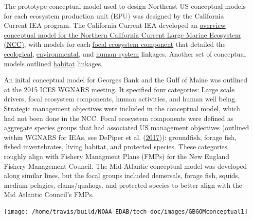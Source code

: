 \documentclass[
]{book}
\begin{document}
The prototype conceptual model used to design Northeast US conceptual models for each ecosystem production unit (EPU) was designed by the California Current IEA program. The California Current IEA developed an \href{https://www.integratedecosystemassessment.noaa.gov/regions/california-current/cc-ecosystem-components}{overview conceptual model for the Northern California Current Large Marine Ecosystem (NCC)}, with models for each \href{https://www.integratedecosystemassessment.noaa.gov/regions/california-current/cc-coastalpelagicspecies\#overview}{focal ecosystem component} that detailed the \href{https://www.integratedecosystemassessment.noaa.gov/regions/california-current/cc-coastalpelagicspecies\#ecologicalinteractions}{ecological}, \href{https://www.integratedecosystemassessment.noaa.gov/regions/california-current/cc-coastalpelagicspecies\#environmentalDrivers}{environmental}, and \href{https://www.integratedecosystemassessment.noaa.gov/regions/california-current/cc-coastalpelagicspecies\#humanActivities}{human system} linkages. Another set of conceptual models outlined \href{https://www.integratedecosystemassessment.noaa.gov/regions/california-current/cc-habitat}{habitat} linkages.

An inital conceptual model for Georges Bank and the Gulf of Maine was outlined at the 2015 ICES WGNARS meeting. It specified four categories: Large scale drivers, focal ecosystem components, human activities, and human well being. Strategic management objectives were included in the conceptual model, which had not been done in the NCC. Focal ecosystem components were defined as aggregate species groups that had associated US management objectives (outlined within WGNARS for IEAs, see DePiper et al. (\protect\hyperlink{ref-depiper_operationalizing_2017}{2017})): groundfish, forage fish, fished invertebrates, living habitat, and protected species. These categories roughly align with Fishery Managment Plans (FMPs) for the New England Fishery Management Council. The Mid-Atlantic conceptual model was developed along similar lines, but the focal groups included demersals, forage fish, squids, medium pelagics, clams/quahogs, and protected species to better align with the Mid Atlantic Council's FMPs.

\texttt{[image: /home/travis/build/NOAA-EDAB/tech-doc/images/GBGOMconceptual1]}
\end{document}
